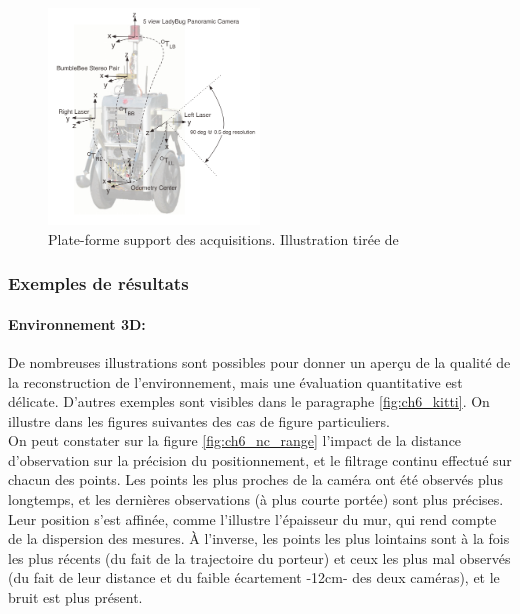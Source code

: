 \begin{figure}
	\centerline {
		\includegraphics[width=0.5\textwidth]{Chapter6/graphics/new_college_setup.png}
	}
	\caption{Plate-forme support des acquisitions. Illustration tirée de \cite{Smith2009}}
	\label{fig:ch6_nc_setup}
\end{figure}

\subsubsection{Exemples de résultats}
\paragraph{Environnement 3D:\\}
De nombreuses illustrations sont possibles pour donner un aperçu de la qualité de la reconstruction de l'environnement, mais une évaluation quantitative est délicate. D'autres exemples sont visibles dans le paragraphe \ref{fig:ch6_kitti}. On illustre dans les figures suivantes des cas de figure particuliers.\\

On peut constater sur la figure \ref{fig:ch6_nc_range} l'impact de la distance d'observation sur la précision du positionnement, et le filtrage continu effectué sur chacun des points. Les points les plus proches de la caméra ont été observés plus longtemps, et les dernières observations (à plus courte portée) sont plus précises. Leur position s'est affinée, comme l'illustre \og l'épaisseur\fg{} du mur, qui rend compte de la dispersion des mesures. À l'inverse, les points les plus lointains sont à la fois les plus récents (du fait de la trajectoire du porteur) et ceux les plus mal observés (du fait de leur distance et du faible écartement -12cm- des deux caméras), et le bruit est plus présent. 

